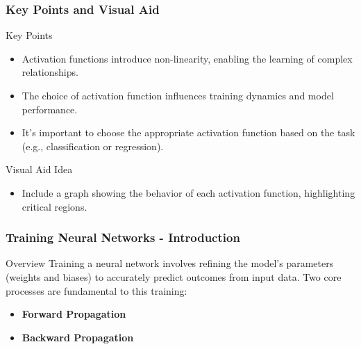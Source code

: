 \documentclass[aspectratio=169]{beamer}
\begin{document}
\begin{frame}[fragile]
    \frametitle{Key Points and Visual Aid}
    \begin{block}{Key Points}
        \begin{itemize}
            \item Activation functions introduce non-linearity, enabling the learning of complex relationships.
            \item The choice of activation function influences training dynamics and model performance.
            \item It's important to choose the appropriate activation function based on the task (e.g., classification or regression).
        \end{itemize}
    \end{block}

    \begin{block}{Visual Aid Idea}
        \begin{itemize}
            \item Include a graph showing the behavior of each activation function, highlighting critical regions.
        \end{itemize}
    \end{block}
\end{frame}

\begin{frame}[fragile]
    \frametitle{Training Neural Networks - Introduction}
    \begin{block}{Overview}
        Training a neural network involves refining the model's parameters (weights and biases) to accurately predict outcomes from input data. Two core processes are fundamental to this training: 
        \begin{itemize}
            \item \textbf{Forward Propagation}
            \item \textbf{Backward Propagation}
        \end{itemize}
    \end{block}
\end{frame}
\end{document}
